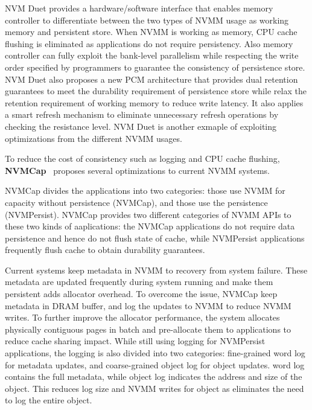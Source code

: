 NVM Duet provides a hardware/software interface that enables memory controller
to differentiate between the two types of NVMM usage as working memory and
persistent store. When NVMM is working as memory, CPU cache flushing is
eliminated as applications do not require persistency. Also memory controller
can fully exploit the bank-level parallelism while respecting the write order 
specified by programmers to guarantee the consistency of persistence store.
NVM Duet also proposes a new PCM architecture that provides dual retention
guarantees to meet the durability requirement of persistence store while relax
the retention requirement of working memory to reduce write latency. It also
applies a smart refresh mechanism to eliminate unnecessary refresh operations
by checking the resistance level. NVM Duet is another exmaple of exploiting
optimizations from the different NVMM usages.

To reduce the cost of consistency such as logging and CPU cache flushing,
\textbf{NVMCap}~\cite{NVMCap}
 proposes several optimizations to current NVMM systems.

NVMCap divides the applications into two categories: those
use NVMM for capacity without persistence (NVMCap), and those use the
persistence (NVMPersist). NVMCap provides two different
categories of NVMM APIs to these two kinds of aaplications: the NVMCap
applications do not require data persistence and hence do not flush state
of cache, while NVMPersist applications frequently flush cache to obtain
durability guarantees.

Current systems keep metadata in NVMM to recovery from system failure.
These metadata are updated frequently during system running and make
them persistent adds allocator overhead. To overcome the issue, NVMCap
keep metadata in DRAM buffer, and log the updates to NVMM to reduce NVMM
writes. To further improve the allocator performance, the system allocates
physically contiguous pages in batch and pre-allocate them to applications 
to reduce cache sharing impact. While still using logging for NVMPersist
applications, the logging is also divided into two categories: fine-grained
word log for metadata updates, and coarse-grained object log for object
updates. word log contains the full metadata, while object log indicates
the address and size of the object. This reduces log size and NVMM writes for
object as eliminates the need to log the entire object.
